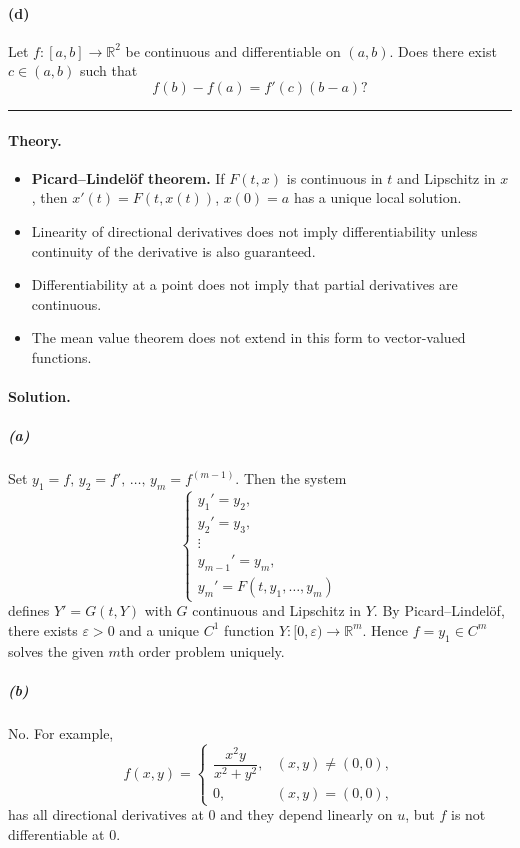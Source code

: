 \documentclass[12pt,a4paper]{article}
\theoremstyle{plain}
\theoremstyle{definition}
\theoremstyle{remark}
\theoremstyle{remark}
\begin{document}
\paragraph{(d)}
Let $f:[a,b]\to\mathbb{R}^2$ be continuous and differentiable on $(a,b)$.
Does there exist $c\in(a,b)$ such that
\[
f(b)-f(a)=f'(c)(b-a)?
\]

\bigskip
\hrule
\bigskip

\paragraph{Theory.}
\begin{itemize}\setlength{\itemsep}{6pt}
	\item \textbf{Picard--Lindelöf theorem.}
	If $F(t,x)$ is continuous in $t$ and Lipschitz in $x$, then $x'(t)=F(t,x(t))$, $x(0)=a$ 
	has a unique local solution.
	\item Linearity of directional derivatives does not imply differentiability unless continuity of the derivative is also guaranteed.
	\item Differentiability at a point does not imply that partial derivatives are continuous.
	\item The mean value theorem does not extend in this form to vector-valued functions.
\end{itemize}

\bigskip

\paragraph{Solution.}

\subparagraph{(a)} 
Set $y_1=f,\,y_2=f',\,\dots,\,y_m=f^{(m-1)}$.
Then the system
\[
\begin{cases}
	y_1'=y_2,\\
	y_2'=y_3,\\
	\vdots\\
	y_{m-1}'=y_m,\\
	y_m'=F(t,y_1,\dots,y_m)
\end{cases}
\]
defines $Y' = G(t,Y)$ with $G$ continuous and Lipschitz in $Y$.
By Picard–Lindelöf, there exists $\varepsilon>0$ and a unique $C^1$ function 
$Y:[0,\varepsilon)\to\mathbb{R}^m$.
Hence $f=y_1\in C^m$ solves the given $m$th order problem uniquely.

\subparagraph{(b)} 
No. For example,
\[
f(x,y)=
\begin{cases}
	\dfrac{x^2y}{x^2+y^2}, & (x,y)\ne(0,0),\\[4pt]
	0,&(x,y)=(0,0),
\end{cases}
\]
has all directional derivatives at $0$ and they depend linearly on $u$, 
but $f$ is not differentiable at $0$.
\end{document}
